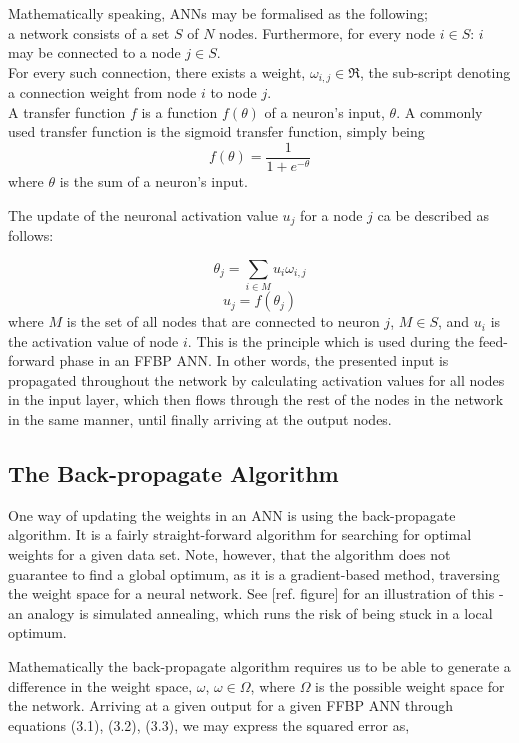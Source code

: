 Mathematically speaking, ANNs may be formalised as the following;
\\
a network consists of a set $S$ of $N$ nodes. Furthermore, for every node $i\in S$: $i$ may be connected to a node $j \in S$.
\\
For every such connection, there exists a weight, $\omega_{i,j} \in \Re$, the sub-script denoting a connection weight from node $i$ to node $j$.
\\
A transfer function $f$ is a function $f(\theta)$ of a neuron's input, $\theta$. A commonly used transfer function is the sigmoid transfer function, simply being 
\begin{equation}
    f(\theta) = \frac{1}{1+e^{-\theta}}
\end{equation}
where $\theta$ is the sum of a neuron's input.

The update of the neuronal activation value $u_j$ for a node $j$ ca be described as follows:

\begin{equation}
    \theta_j = \sum_{i\in M} u_i \omega_{i,j}
\end{equation}
\begin{equation}
    u_j = f(\theta_j)
\end{equation}
where $M$ is the set of all nodes that are connected to neuron $j$, $M \in S$, and $u_i$ is the activation value of node $i$. This is the principle which is used during the feed-forward phase in an FFBP ANN. In other words, the presented input is propagated throughout the network by calculating activation values for all nodes in the input layer, which then flows through the rest of the nodes in the network in the same manner, until finally arriving at the output nodes.


\subsection{The Back-propagate Algorithm}

One way of updating the weights in an ANN is using the back-propagate algorithm. It is a fairly straight-forward algorithm for searching for optimal weights for a given data set. Note, however, that the algorithm does not guarantee to find a global optimum, as it is a gradient-based method, traversing the weight space for a neural network. See [ref. figure] for an illustration of this - an analogy is simulated annealing, which runs the risk of being stuck in a local optimum.

Mathematically the back-propagate algorithm requires us to be able to generate a difference in the weight space, $\omega$, $\omega \in \Omega$, where $\Omega$ is the possible weight space for the network. Arriving at a given output for a given FFBP ANN through equations (3.1), (3.2), (3.3), we may express the squared error as,

